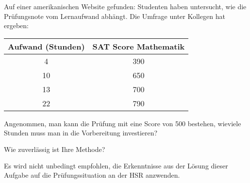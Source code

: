 Auf einer amerikanischen Website gefunden: Studenten haben untersucht,
wie die Prüfungsnote vom Lernaufwand abhängt.
Die Umfrage unter Kollegen hat ergeben:
\begin{center}
\begin{tabular}{c|c}
Aufwand (Stunden)&SAT Score Mathematik\\
\hline
4&390\\
10&650\\
13&700\\
22&790
\end{tabular}
\end{center}
\begin{teilaufgaben}
\item
Angenommen, man kann die Prüfung mit eine Score von 500 bestehen, 
wieviele Stunden muss man in die Vorbereitung investieren?
\item
Wie zuverlässig ist Ihre Methode?
\end{teilaufgaben}


\begin{hinweis}
Es wird nicht unbedingt empfohlen, die Erkenntnisse aus der
Lösung dieser Aufgabe auf die Prüfungssituation an der HSR anzwenden.
\end{hinweis}

